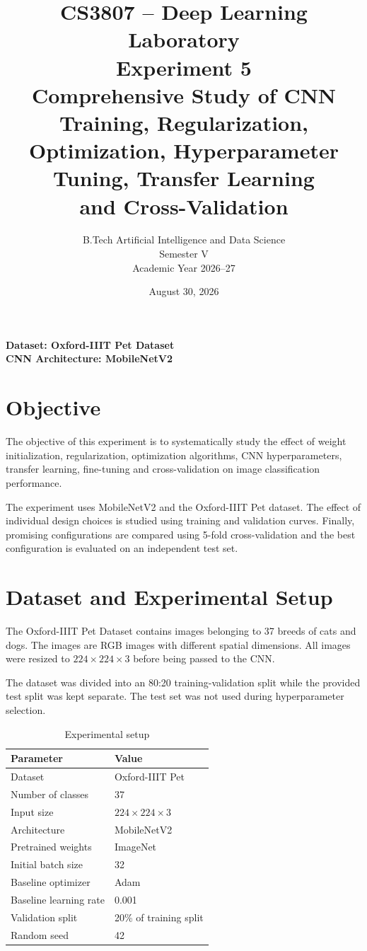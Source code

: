 \documentclass[12pt,a4paper]{article}
\title{
    \textbf{CS3807 -- Deep Learning Laboratory}\\[0.4cm]
    \large Experiment 5\\[0.2cm]
    \Large Comprehensive Study of CNN Training, Regularization,\\
    Optimization, Hyperparameter Tuning, Transfer Learning\\
    and Cross-Validation
}
\author{
    B.Tech Artificial Intelligence and Data Science\\
    Semester V\\
    Academic Year 2026--27
}
\date{August 30, 2026}
\begin{document}
\maketitle
\thispagestyle{empty}

\begin{center}
\textbf{Dataset: Oxford-IIIT Pet Dataset}\\
\textbf{CNN Architecture: MobileNetV2}
\end{center}

\newpage
\tableofcontents
\newpage

\section{Objective}

The objective of this experiment is to systematically study the effect of weight
initialization, regularization, optimization algorithms, CNN hyperparameters,
transfer learning, fine-tuning and cross-validation on image classification
performance.

The experiment uses MobileNetV2 and the Oxford-IIIT Pet dataset. The effect of
individual design choices is studied using training and validation curves.
Finally, promising configurations are compared using 5-fold cross-validation
and the best configuration is evaluated on an independent test set.

\section{Dataset and Experimental Setup}

The Oxford-IIIT Pet Dataset contains images belonging to 37 breeds of cats and
dogs. The images are RGB images with different spatial dimensions. All images
were resized to $224\times224\times3$ before being passed to the CNN.

The dataset was divided into an 80:20 training-validation split while the
provided test split was kept separate. The test set was not used during
hyperparameter selection.

\begin{table}[H]
\centering
\caption{Experimental setup}
\begin{tabular}{ll}
\toprule
Parameter & Value\\
\midrule
Dataset & Oxford-IIIT Pet\\
Number of classes & 37\\
Input size & $224\times224\times3$\\
Architecture & MobileNetV2\\
Pretrained weights & ImageNet\\
Initial batch size & 32\\
Baseline optimizer & Adam\\
Baseline learning rate & 0.001\\
Validation split & 20\% of training split\\
Random seed & 42\\
\bottomrule
\end{tabular}
\end{table}
\end{document}
